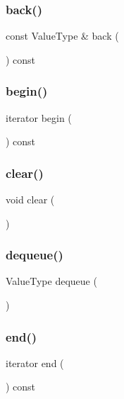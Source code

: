 \subsubsection{\texorpdfstring{back()}{back()}}
{\footnotesize\ttfamily const Value\+Type \& back (\begin{DoxyParamCaption}{ }\end{DoxyParamCaption}) const}

\mbox{\label{classQueue_a0c62c15c8ed609e7e5e9518cf5f5c712}} 
\subsubsection{\texorpdfstring{begin()}{begin()}}
{\footnotesize\ttfamily iterator begin (\begin{DoxyParamCaption}{ }\end{DoxyParamCaption}) const\hspace{0.3cm}{\ttfamily [inline]}}

\mbox{\label{classQueue_ac8bb3912a3ce86b15842e79d0b421204}} 
\subsubsection{\texorpdfstring{clear()}{clear()}}
{\footnotesize\ttfamily void clear (\begin{DoxyParamCaption}{ }\end{DoxyParamCaption})}

\mbox{\label{classQueue_aaee07e371e2370e76e6c42bada727ba2}} 
\subsubsection{\texorpdfstring{dequeue()}{dequeue()}}
{\footnotesize\ttfamily Value\+Type dequeue (\begin{DoxyParamCaption}{ }\end{DoxyParamCaption})}

\mbox{\label{classQueue_a68b688a51bd0cf6fb5bc2cba292209a8}} 
\subsubsection{\texorpdfstring{end()}{end()}}
{\footnotesize\ttfamily iterator end (\begin{DoxyParamCaption}{ }\end{DoxyParamCaption}) const\hspace{0.3cm}{\ttfamily [inline]}}

